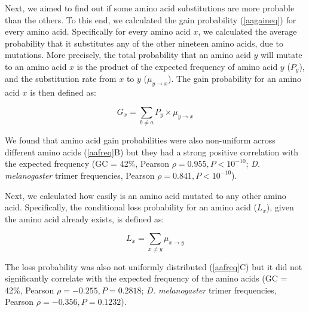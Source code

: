 \documentclass[12pt,a4paper]{article}
\begin{document}
Next, we aimed to find out if some amino acid substitutions are more probable than the others. To this end, we calculated the gain probability (\autoref{aagaineq}) for every amino acid. Specifically for every amino acid $x$, we calculated the average probability that it substitutes any of the other nineteen amino acids, due to mutations. More precisely, the total probability that an amino acid $y$ will mutate to an amino acid $x$ is the product of the expected frequency of amino acid $y$ ($P_y$), and the substitution rate from $x$ to $y$ ($\mu_{y\to x}$). The gain probability for an amino acid $x$ is then defined as:

\begin{equation}
G_x = \sum_{b \neq a} P_y \times \mu_{y\to x}
\label{aagaineq}
\end{equation}

We found that amino acid gain probabilities were also non-uniform across different amino acids (\autoref{aafreq}{\color{blue}B}) but they had a strong positive correlation with the expected frequency (GC = 42\%, Pearson $\rho = 0.955, P<10^{-10}$; \textit{D. melanogaster} trimer frequencies, Pearson $\rho = 0.841, P<10^{-10}$).

Next, we calculated how easily is an amino acid mutated to any other amino acid. Specifically, the conditional loss probability for an amino acid ($L_x$), given the amino acid already exists, is defined as:

\begin{equation}
L_x = \sum_{x \neq y} \mu_{x\to y}
\label{aalosseq}
\end{equation}


The loss probability was also not uniformly distributed (\autoref{aafreq}{\color{blue}C}) but it did not significantly correlate with the expected frequency of the amino acids (GC = 42\%, Pearson $\rho = -0.255, P = 0.2818$; \textit{D. melanogaster} trimer frequencies, Pearson $\rho = -0.356, P=0.1232$).
\end{document}
